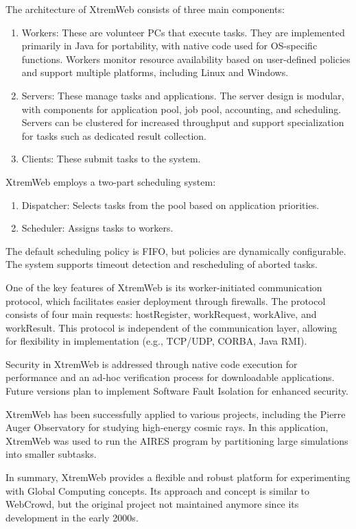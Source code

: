 The architecture of XtremWeb consists of three main components:
\begin{enumerate}
  \item Workers: These are volunteer PCs that execute tasks. They are implemented primarily in Java for portability, with native code used for OS-specific functions. Workers monitor resource availability based on user-defined policies and support multiple platforms, including Linux and Windows.
  \item Servers: These manage tasks and applications. The server design is modular, with components for application pool, job pool, accounting, and scheduling. Servers can be clustered for increased throughput and support specialization for tasks such as dedicated result collection.
  \item Clients: These submit tasks to the system.
\end{enumerate}
XtremWeb employs a two-part scheduling system:
\begin{enumerate}
  \item Dispatcher: Selects tasks from the pool based on application priorities.
  \item Scheduler: Assigns tasks to workers.
\end{enumerate}
The default scheduling policy is FIFO, but policies are dynamically configurable. The system supports timeout detection and rescheduling of aborted tasks.

One of the key features of XtremWeb is its worker-initiated communication protocol, which facilitates easier deployment through firewalls. The protocol consists of four main requests: hostRegister, workRequest, workAlive, and workResult. This protocol is independent of the communication layer, allowing for flexibility in implementation (e.g., TCP/UDP, CORBA, Java RMI). \cite{relatedwork:xtremweb}

Security in XtremWeb is addressed through native code execution for performance and an ad-hoc verification process for downloadable applications. Future versions plan to implement Software Fault Isolation for enhanced security.

XtremWeb has been successfully applied to various projects, including the Pierre Auger Observatory for studying high-energy cosmic rays. In this application, XtremWeb was used to run the \ac{AIRES} program by partitioning large simulations into smaller subtasks. \cite{relatedwork:xtremweb}

In summary, XtremWeb provides a flexible and robust platform for experimenting with Global Computing concepts. Its approach and concept is similar to WebCrowd, but the original project not maintained anymore since its development in the early 2000s.

